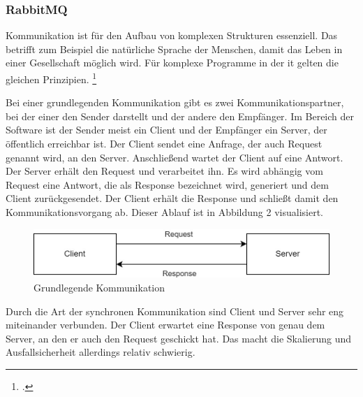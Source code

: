 \subsubsection{RabbitMQ}
Kommunikation ist für den Aufbau von komplexen Strukturen essenziell. Das betrifft zum Beispiel die natürliche Sprache der Menschen, damit das Leben in einer Gesellschaft möglich wird. Für komplexe Programme in der \ac{it} gelten die gleichen Prinzipien. \footcite{dossot2014rabbitmq}

Bei einer grundlegenden Kommunikation gibt es zwei Kommunikationspartner, bei der einer den Sender darstellt und der andere den Empfänger. Im Bereich der Software ist der Sender meist ein Client und der Empfänger ein Server, der öffentlich erreichbar ist. Der Client sendet eine Anfrage, der auch Request genannt wird, an den Server. Anschließend wartet der Client auf eine Antwort. Der Server erhält den Request und verarbeitet ihn. Es wird abhängig vom Request eine Antwort, die als Response bezeichnet wird, generiert und dem Client zurückgesendet. Der Client erhält die Response und schließt damit den Kommunikationsvorgang ab. Dieser Ablauf ist in Abbildung 2 visualisiert.

\begin{figure}[H]
  \centering
    \includegraphics[width = 12cm]{bilder/Rabbit1}
    \caption{Grundlegende Kommunikation}
\end{figure}

Durch die Art der synchronen Kommunikation sind Client und Server sehr eng miteinander verbunden. Der Client erwartet eine Response von genau dem Server, an den er auch den Request geschickt hat. Das macht die Skalierung und Ausfallsicherheit allerdings relativ schwierig.


